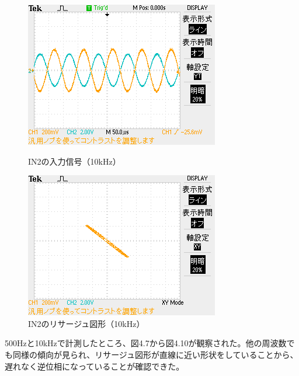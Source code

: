 \documentclass{jlreq}
\numberwithin{equation}{section}
\begin{document}
\begin{figure}[H]
  \centering
  \begin{minipage}{0.45\textwidth}
    \centering
    \includegraphics[width=\textwidth, keepaspectratio]{IN2_10kHz_YT.png}
    \caption{IN2の入力信号（10kHz）}
  \end{minipage}
  \hfill
  \begin{minipage}{0.45\textwidth}
    \centering
    \includegraphics[width=\textwidth, keepaspectratio]{IN2_10kHz_XY.png}
    \caption{IN2のリサージュ図形（10kHz）}
  \end{minipage}
\end{figure}

500Hzと10kHzで計測したところ、図4.7から図4.10が観察された。他の周波数でも同様の傾向が見られ、リサージュ図形が直線に近い形状をしていることから、遅れなく逆位相になっていることが確認できた。
\end{document}

